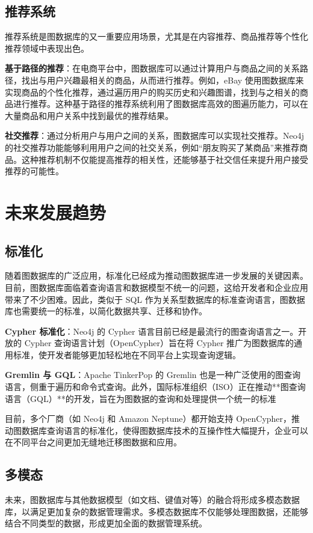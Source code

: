 \documentclass[12pt,hyperref,a4paper,UTF8]{ctexart}
\begin{document}
\subsection{推荐系统}
推荐系统是图数据库的又一重要应用场景，尤其是在内容推荐、商品推荐等个性化推荐领域中表现出色\cite{秦川2020基于知识图谱的推荐系统研究综述,刘佳玮2021基于异质信息网络的推荐系统研究综述}。

\textbf{基于路径的推荐}：在电商平台中，图数据库可以通过计算用户与商品之间的关系路径，找出与用户兴趣最相关的商品，从而进行推荐。例如，eBay 使用图数据库来实现商品的个性化推荐，通过遍历用户的购买历史和兴趣图谱，找到与之相关的商品进行推荐。这种基于路径的推荐系统利用了图数据库高效的图遍历能力，可以在大量商品和用户关系中找到最优的推荐结果\cite{fayyaz2020recommendation,wu2022graph,赵俊逸2021协同过滤推荐系统综述}。

\textbf{社交推荐}：通过分析用户与用户之间的关系，图数据库可以实现社交推荐。Neo4j 的社交推荐功能能够利用用户之间的社交关系，例如“朋友购买了某商品”来推荐商品。这种推荐机制不仅能提高推荐的相关性，还能够基于社交信任来提升用户接受推荐的可能性\cite{fayyaz2020recommendation,赵俊逸2021协同过滤推荐系统综述}。

\section{未来发展趋势}

\subsection{标准化}
随着图数据库的广泛应用，标准化已经成为推动图数据库进一步发展的关键因素。目前，图数据库面临着查询语言和数据模型不统一的问题，这给开发者和企业应用带来了不少困难。因此，类似于 SQL 作为关系型数据库的标准查询语言，图数据库也需要统一的标准，以简化数据共享、迁移和协作。

\textbf{Cypher 标准化}：Neo4j 的 Cypher 语言目前已经是最流行的图查询语言之一。开放的 Cypher 查询语言计划（OpenCypher）旨在将 Cypher 推广为图数据库的通用标准，使开发者能够更加轻松地在不同平台上实现查询逻辑。

\textbf{Gremlin 与 GQL}：Apache TinkerPop 的 Gremlin 也是一种广泛使用的图查询语言，侧重于遍历和命令式查询。此外，国际标准组织（ISO）正在推动**图查询语言（GQL）**的开发，旨在为图数据的查询和处理提供一个统一的标准

目前，多个厂商（如 Neo4j 和 Amazon Neptune）都开始支持 OpenCypher，推动图数据库查询语言的标准化，使得图数据库技术的互操作性大幅提升，企业可以在不同平台之间更加无缝地迁移图数据和应用。
\subsection{多模态}
未来，图数据库与其他数据模型（如文档、键值对等）的融合将形成多模态数据库，以满足更加复杂的数据管理需求。多模态数据库不仅能够处理图数据，还能够结合不同类型的数据，形成更加全面的数据管理系统。
\end{document}
